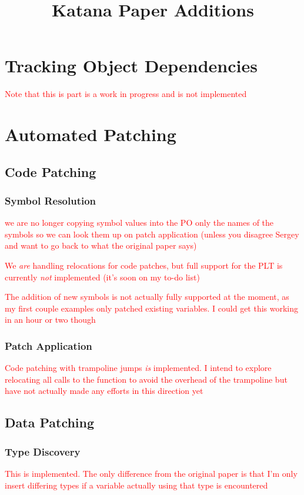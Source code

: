 \documentclass[a4paper,12pt]{article}
\begin{document}
\title{Katana Paper Additions}
\maketitle

\addtocounter{section}{1}

\section{Tracking Object Dependencies}
\textcolor{red}{Note that this is part is a work in progress and is
  not implemented}

\section{Automated Patching}
\subsection{Code Patching}
\subsubsection{Symbol Resolution}
\textcolor{red}{we are no longer copying symbol values into the PO
  only the names of the symbols so we can look them up on patch
  application (unless you disagree Sergey and want to go back to what
  the original paper says)}

\textcolor{red}{We \emph{are} handling relocations for code patches,
  but full support for the PLT is currently \emph{not} implemented
  (it's soon on my to-do list)}

\textcolor{red}{The addition of new symbols is not actually fully
  supported at the moment, as my first couple examples only patched
  existing variables. I could get this working in an hour or two
  though}

\subsubsection{Patch Application}
\textcolor{red}{Code patching with trampoline jumps \emph{is}
  implemented. I intend to explore relocating all calls to the
  function to avoid the overhead of the trampoline but have not
  actually made any efforts in this direction yet}

\subsection{Data Patching}
\subsubsection{Type Discovery}
\textcolor{red}{This is implemented. The only difference from the
  original paper is that I'm only insert differing types if a variable
actually using that type is encountered}
\end{document}
